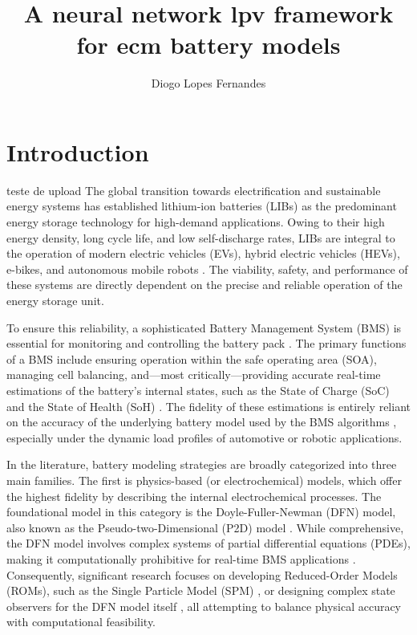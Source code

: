 \documentclass[]{article}
\title{A neural network lpv framework for ecm battery models}
\author{Diogo Lopes Fernandes}
\begin{document}
\maketitle

\begin{abstract}

\end{abstract}

\section{Introduction}
teste de upload
The global transition towards electrification and sustainable energy systems has established lithium-ion batteries (LIBs) as the predominant energy storage technology for high-demand applications. Owing to their high energy density, long cycle life, and low self-discharge rates, LIBs are integral to the operation of modern electric vehicles (EVs), hybrid electric vehicles (HEVs), e-bikes, and autonomous mobile robots \cite{mawuntu2023modeling}. The viability, safety, and performance of these systems are directly dependent on the precise and reliable operation of the energy storage unit.

To ensure this reliability, a sophisticated Battery Management System (BMS) is essential for monitoring and controlling the battery pack \cite{tekin2024comparative}. The primary functions of a BMS include ensuring operation within the safe operating area (SOA), managing cell balancing, and—most critically—providing accurate real-time estimations of the battery's internal states, such as the State of Charge (SoC) and the State of Health (SoH) \cite{damodaran2024fast}. The fidelity of these estimations is entirely reliant on the accuracy of the underlying battery model used by the BMS algorithms \cite{tran2021comprehensive}, especially under the dynamic load profiles of automotive or robotic applications.

In the literature, battery modeling strategies are broadly categorized into three main families. The first is physics-based (or electrochemical) models, which offer the highest fidelity by describing the internal electrochemical processes. The foundational model in this category is the Doyle-Fuller-Newman (DFN) model, also known as the Pseudo-two-Dimensional (P2D) model \cite{piruzjam2024analytical}. While comprehensive, the DFN model involves complex systems of partial differential equations (PDEs), making it computationally prohibitive for real-time BMS applications \cite{khalik2021model}. Consequently, significant research focuses on developing Reduced-Order Models (ROMs), such as the Single Particle Model (SPM) \cite{li2018single, piruzjam2024analytical}, or designing complex state observers for the DFN model itself \cite{drummond2019observer}, all attempting to balance physical accuracy with computational feasibility.
\end{document}
